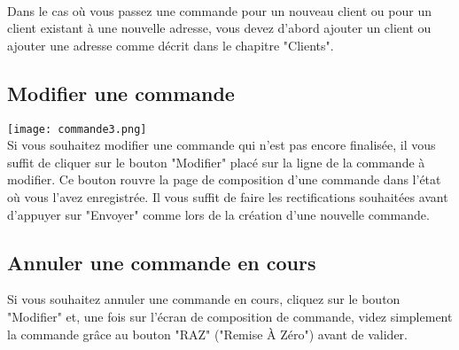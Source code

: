 \paragraph{}
Dans le cas où vous passez une commande pour un nouveau client ou pour un client
existant à une nouvelle adresse, vous devez d'abord ajouter un client ou ajouter
une adresse comme décrit dans le chapitre "Clients".

\subsection{Modifier une commande}

\texttt{[image: commande3.png]}\\

Si vous souhaitez modifier une commande qui n'est pas encore finalisée, il
vous suffit de cliquer sur le bouton "Modifier" placé sur la ligne de la
commande à modifier. Ce bouton rouvre la page de composition d'une commande dans
l'état où vous l'avez enregistrée. Il vous suffit de faire les rectifications
souhaitées avant d'appuyer sur "Envoyer" comme lors de la création d'une
nouvelle commande.

\subsection{Annuler une commande en cours}
Si vous souhaitez annuler une commande en cours, cliquez sur le bouton
"Modifier" et, une fois sur l'écran de composition de commande, videz simplement
la commande grâce au bouton "RAZ" ("Remise À Zéro") avant de valider.
